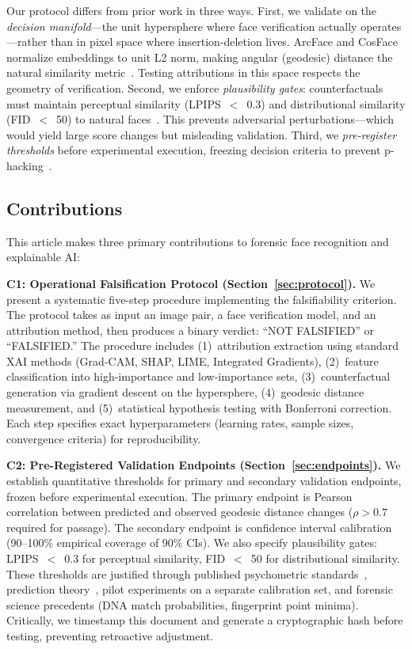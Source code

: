 Our protocol differs from prior work in three ways. First, we validate on the \textit{decision manifold}—the unit hypersphere where face verification actually operates—rather than in pixel space where insertion-deletion lives. ArcFace and CosFace normalize embeddings to unit L2 norm, making angular (geodesic) distance the natural similarity metric~\cite{deng2019arcface,wang2018cosface}. Testing attributions in this space respects the geometry of verification. Second, we enforce \textit{plausibility gates}: counterfactuals must maintain perceptual similarity (LPIPS~$<$~0.3) and distributional similarity (FID~$<$~50) to natural faces~\cite{zhang2018perceptual,heusel2017fid}. This prevents adversarial perturbations—which would yield large score changes but misleading validation. Third, we \textit{pre-register thresholds} before experimental execution, freezing decision criteria to prevent p-hacking~\cite{nosek2018preregistration}.

\subsection{Contributions}

This article makes three primary contributions to forensic face recognition and explainable AI:

\textbf{C1: Operational Falsification Protocol (Section~\ref{sec:protocol}).} We present a systematic five-step procedure implementing the falsifiability criterion. The protocol takes as input an image pair, a face verification model, and an attribution method, then produces a binary verdict: ``NOT FALSIFIED'' or ``FALSIFIED.'' The procedure includes (1)~attribution extraction using standard XAI methods (Grad-CAM, SHAP, LIME, Integrated Gradients), (2)~feature classification into high-importance and low-importance sets, (3)~counterfactual generation via gradient descent on the hypersphere, (4)~geodesic distance measurement, and (5)~statistical hypothesis testing with Bonferroni correction. Each step specifies exact hyperparameters (learning rates, sample sizes, convergence criteria) for reproducibility.

\textbf{C2: Pre-Registered Validation Endpoints (Section~\ref{sec:endpoints}).} We establish quantitative thresholds for primary and secondary validation endpoints, frozen before experimental execution. The primary endpoint is Pearson correlation between predicted and observed geodesic distance changes ($\rho > 0.7$ required for passage). The secondary endpoint is confidence interval calibration (90--100\% empirical coverage of 90\% CIs). We also specify plausibility gates: LPIPS~$<$~0.3 for perceptual similarity, FID~$<$~50 for distributional similarity. These thresholds are justified through published psychometric standards~\cite{koo2016reliability}, prediction theory~\cite{cohen1988statistical}, pilot experiments on a separate calibration set, and forensic science precedents (DNA match probabilities, fingerprint point minima). Critically, we timestamp this document and generate a cryptographic hash before testing, preventing retroactive adjustment.

